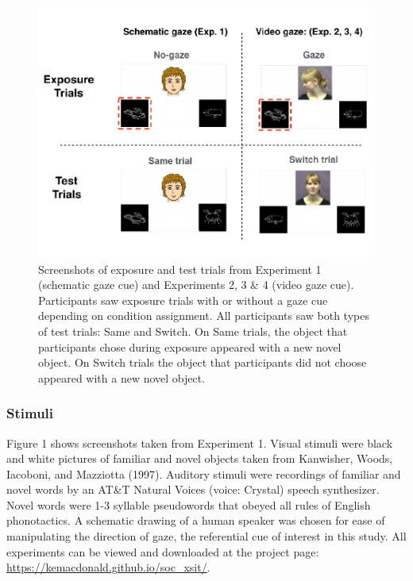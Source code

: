 \documentclass[authoryear, review]{elsarticle}
\newenvironment{CodeChunk}{}{}
\begin{document}
\begin{CodeChunk}
\begin{figure}[tb]

{\centering \includegraphics[width=0.8\linewidth]{figs/stimuli-1} 

}

\caption[Screenshots of exposure and test trials from Experiment 1 (schematic gaze cue) and Experiments 2, 3 \& 4 (video gaze cue)]{Screenshots of exposure and test trials from Experiment 1 (schematic gaze cue) and Experiments 2, 3 \& 4 (video gaze cue). Participants saw exposure trials with or without a gaze cue depending on condition assignment. All participants saw both types of test trials: Same and Switch. On Same trials, the object that participants chose during exposure appeared with a new novel object. On Switch trials the object that participants did not choose appeared with a new novel object.}\label{fig:stimuli}
\end{figure}
\end{CodeChunk}

\subsubsection{Stimuli}\label{stimuli}

Figure 1 shows screenshots taken from Experiment 1. Visual stimuli were
black and white pictures of familiar and novel objects taken from
Kanwisher, Woods, Iacoboni, and Mazziotta (1997). Auditory stimuli were
recordings of familiar and novel words by an AT\&T Natural Voices
\texttrademark (voice: Crystal) speech synthesizer. Novel words were 1-3
syllable pseudowords that obeyed all rules of English phonotactics. A
schematic drawing of a human speaker was chosen for ease of manipulating
the direction of gaze, the referential cue of interest in this study.
All experiments can be viewed and downloaded at the project page:
\url{https://kemacdonald.github.io/soc_xsit/}.
\end{document}
